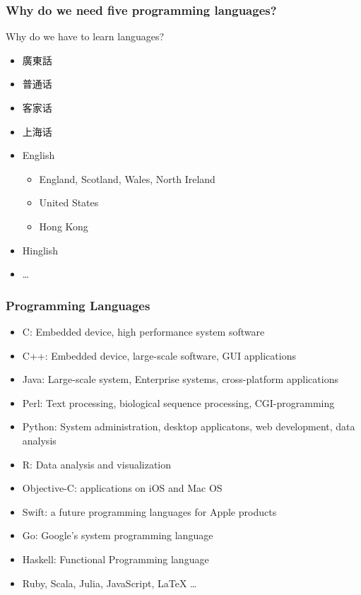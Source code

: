 \documentclass[UTF8]{beamer}
\begin{document}
\begin{frame}
  \frametitle{Why do we need five programming languages?}
  \begin{block}{Why do we have to learn languages?}
  \begin{itemize}
    \item 廣東話
    \item 普通话
    \item 客家话
    \item 上海话
    \item English
    \begin{itemize}
      \item England, Scotland, Wales, North Ireland
      \item United States
      \item Hong Kong
    \end{itemize}
    \item Hinglish
    \item \ldots
  \end{itemize}
\end{block}
\end{frame}

\begin{frame}
  \frametitle{Programming Languages}
  \tiny
  \begin{itemize}
    \item C: Embedded device, high performance system software
    \item C++: Embedded device, large-scale software, GUI applications
    \item Java: Large-scale system, Enterprise systems, cross-platform applications
    \item Perl: Text processing, biological sequence processing, CGI-programming
    \item Python: System administration, desktop applicatons, web development, data analysis
    \item R: Data analysis and visualization
    \item Objective-C: applications on iOS and Mac OS
    \item Swift: a future programming languages for Apple products
    \item Go: Google's system programming language
    \item Haskell: Functional Programming language
    \item Ruby, Scala, Julia, JavaScript, LaTeX \ldots
  \end{itemize}
\end{frame}
\end{document}
